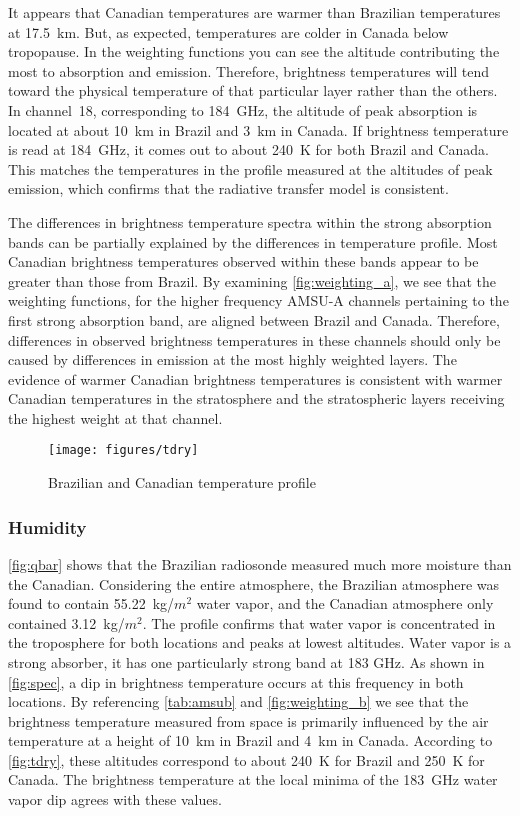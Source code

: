 \documentclass[twocol]{ametsoc}
\begin{document}
It appears that Canadian temperatures are warmer than Brazilian temperatures at 17.5~km.
But, as expected, temperatures are colder in Canada below tropopause.
In the weighting functions you can see the altitude contributing the most to absorption and emission. Therefore, brightness temperatures will tend toward the physical temperature of that particular layer rather than the others.
In channel~18, corresponding to 184~GHz, the altitude of peak absorption is located at about 10~km in Brazil and 3~km in Canada.
If brightness temperature is read at 184~GHz, it comes out to about 240~K for both Brazil and Canada.
This matches the temperatures in the profile measured at the altitudes of peak emission, which confirms that the radiative transfer model is consistent.

The differences in brightness temperature spectra within the strong absorption bands can be partially explained by the differences in temperature profile.
Most Canadian brightness temperatures observed within these bands appear to be greater than those from Brazil.
By examining \autoref{fig:weighting_a}, we see that the weighting functions, for the higher frequency AMSU-A channels pertaining to the first strong absorption band, are aligned between Brazil and Canada.
Therefore, differences in observed brightness temperatures in these channels should only be caused by differences in emission at the most highly weighted layers.
The evidence of warmer Canadian brightness temperatures is consistent with warmer Canadian temperatures in the stratosphere and the stratospheric layers receiving the highest weight at that channel.

\begin{figure}
	\centering
	\texttt{[image: figures/tdry]}
	\caption{Brazilian and Canadian temperature profile}
	\label{fig:tdry}
\end{figure}

\subsubsection{Humidity}

\autoref{fig:qbar} shows that the Brazilian radiosonde measured much more moisture than the Canadian.
Considering the entire atmosphere, the Brazilian atmosphere was found to contain 55.22~kg/$m^2$ water vapor, and the Canadian atmosphere only contained 3.12~kg/$m^2$.
The profile confirms that water vapor is concentrated in the troposphere for both locations and peaks at lowest altitudes.
Water vapor is a strong absorber, it has one particularly strong band at 183 GHz.
As shown in \autoref{fig:spec}, a dip in brightness temperature occurs at this frequency in both locations.
By referencing \autoref{tab:amsub} and \autoref{fig:weighting_b} we see that the brightness temperature measured from space is primarily influenced by the air temperature at a height of 10~km in Brazil and 4~km in Canada.
According to \autoref{fig:tdry}, these altitudes correspond to about 240~K for Brazil and 250~K for Canada.
The brightness temperature at the local minima of the 183~GHz water vapor dip agrees with these values.
\end{document}
